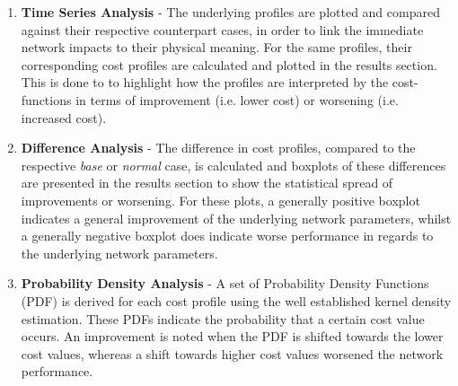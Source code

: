 \begin{enumerate}
	\item \textbf{Time Series Analysis} - 
	The underlying profiles are plotted and compared against their respective counterpart cases, in order to link the immediate network impacts to their physical meaning.
	For the same profiles, their corresponding cost profiles are calculated and plotted in the results section.
	This is done to to highlight how the profiles are interpreted by the cost-functions in terms of improvement (i.e. lower cost) or worsening (i.e. increased cost).
	\item \textbf{Difference Analysis} - 
	The difference in cost profiles, compared to the respective \textit{base} or \textit{normal} case, is calculated and boxplots of these differences are presented in the results section to show the statistical spread of improvements or worsening.
	For these plots, a generally positive boxplot indicates a general improvement of the underlying network parameters, whilst a generally negative boxplot does indicate worse performance in regards to the underlying network parameters.
	\item \textbf{Probability Density Analysis} - 
	A set of Probability Density Functions (PDF) is derived for each cost profile using the well established kernel density estimation.
	These PDFs indicate the probability that a certain cost value occurs.
	An improvement is noted when the PDF is shifted towards the lower cost values, whereas a shift towards higher cost values worsened the network performance.
\end{enumerate}





